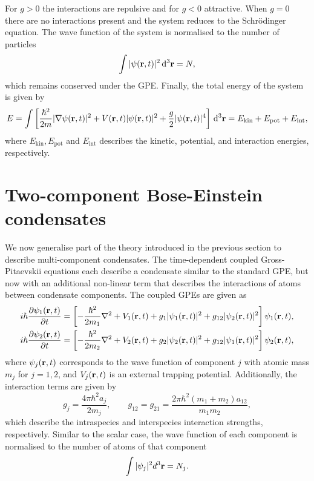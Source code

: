 For \(g>0\) the interactions are repulsive and for \(g < 0\) attractive.
When \(g=0\) there are no interactions present and the system reduces to the
Schr\"{o}dinger equation.
The wave function of the system is normalised to the number of particles
\begin{equation}
    \int |\psi(\vb{r}, t)|^2 \, \dd^3\vb{r} = N,
\end{equation}
which remains conserved under the GPE\@.
Finally, the total energy of the system is given by
\begin{equation}
    E = \int  \left[\frac{\hbar^2}{2m}|\nabla\psi(\vb{r}, t)|^2
        + V(\vb{r}, t)|\psi(\vb{r}, t)|^2 + \frac{g}{2}|\psi(\vb{r}, t)|^4
        \right] \, \dd^3\vb{r}
    = E_\mathrm{kin} + E_\mathrm{pot} + E_\mathrm{int},
\end{equation}
where \(E_\mathrm{kin}, E_\mathrm{pot}\) and \(E_\mathrm{int}\) describes the
kinetic, potential, and interaction energies, respectively.

\section{Two-component Bose-Einstein condensates}\label{sec: two-comp-theory}
We now generalise part of the theory introduced in the previous section to
describe multi-component condensates.
The time-dependent coupled Gross-Pitaevskii equations each describe a condensate
similar to the standard GPE, but now with an additional non-linear term that
describes the interactions of atoms between condensate components.
The coupled GPEs are given as
\begin{equation}\label{eq: two-component-GPEs}
    \begin{aligned}
        i\hbar \pdv{\psi_1(\vb{r}, t)}{t} & =
        \left[-\frac{\hbar^2}{2m_1}\nabla^2 + V_1(\vb{r}, t)
            + g_1|\psi_1(\vb{r}, t)|^2
        + g_{12}|\psi_2(\vb{r}, t)|^2\right]\psi_1(\vb{r}, t), \\
        i\hbar \pdv{\psi_2(\vb{r}, t)}{t} & =
        \left[-\frac{\hbar^2}{2m_2}\nabla^2 + V_2(\vb{r}, t)
            + g_2|\psi_2(\vb{r}, t)|^2
            + g_{12}|\psi_1(\vb{r}, t)|^2\right]\psi_2(\vb{r}, t),
    \end{aligned}
\end{equation}
where \(\psi_j(\vb{r}, t)\) corresponds to the wave function of component \(j\)
with atomic mass \(m_j\) for \(j=1, 2\), and \(V_j(\vb{r}, t)\) is an external
trapping potential.
Additionally, the interaction terms are given by
\begin{equation}
    g_j = \frac{4\pi \hbar^2a_j}{2m_j}, \qquad
    g_{12} = g_{21} = \frac{2\pi\hbar^2(m_1+m_2)a_{12}}{m_1m_2},
\end{equation}
which describe the intraspecies and interspecies interaction strengths,
respectively.
Similar to the scalar case, the wave function of each component is normalised
to the number of atoms of that component
\begin{equation}
    \int |\psi_j|^2 d^3\vb{r} = N_j.
\end{equation}

